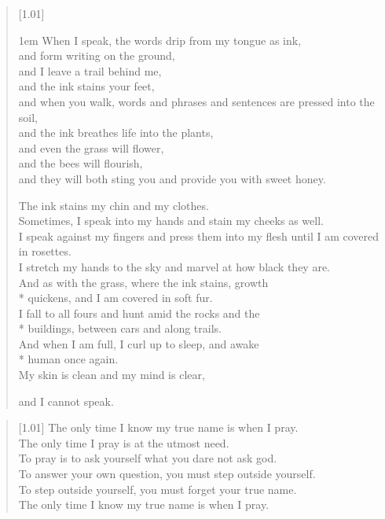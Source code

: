 \null
\vfill
\begin{verse}[1.01\textwidth]
    {\vgap1em
    When I speak, the words drip from my tongue as ink,\\
    and form writing on the ground,\\
    and I leave a trail behind me,\\
    and the ink stains your feet,\\
    and when you walk, words and phrases and sentences are pressed into the soil,\\
    and the ink breathes life into the plants,\\
    and even the grass will flower,\\
    and the bees will flourish,\\
    and they will both sting you and provide you with sweet honey.

    The ink stains my chin and my clothes.\\
    \vin Sometimes, I speak into my hands and stain my cheeks as well.\\
    \vin \vin I speak against my fingers and press them into my flesh until I am covered in rosettes.\\
    \vin \vin \vin I stretch my hands to the sky and marvel at how black they are.\\
    \vin \vin \vin \vin And as with the grass, where the ink stains, growth\\*
    \vin \vin \vin \vin quickens, and I am covered in soft fur.\\
    \vin \vin \vin \vin \vin I fall to all fours and hunt amid the rocks and the\\*
    \vin \vin \vin \vin \vin buildings, between cars and along trails.\\
    \vin \vin \vin \vin \vin \vin And when I am full, I curl up to sleep, and awake\\*
    \vin \vin \vin \vin \vin \vin human once again.\\
    \vin \vin \vin \vin \vin \vin \vin My skin is clean and my mind is clear,

    and I cannot speak.}
\end{verse}
\vfill
\newpage

\null
\vfill
\begin{verse}[1.01\textwidth]
    The only time I know my true name is when I pray.\\
    The only time I pray is at the utmost need.\\
    To pray is to ask yourself what you dare not ask god.\\
    To answer your own question, you must step outside yourself.\\
    To step outside yourself, you must forget your true name.\\
    The only time I know my true name is when I pray.
\end{verse}
\vfill
\newpage


